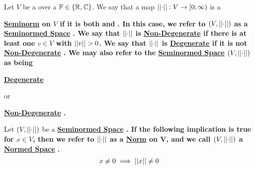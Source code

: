 \label{def:seminorm}
\newcommand{\Seminorm}[0]{
    \bf \hyperref[def:seminorm]{Seminorm} \rm
}\newcommand{\Seminorms}[0]{
    \bf \hyperref[def:seminorm]{Seminorms} \rm
}
\newcommand{\NonDegenerate}[0]{
	\bf \hyperref[def:seminorm]{Non-Degenerate} \rm
}
\newcommand{\Degenerate}[0]{
	\bf \hyperref[def:seminorm]{Degenerate} \rm
}
\label{def:seminormedspace}
\newcommand{\SeminormedSpace}[0]{
    \bf \hyperref[def:seminormedspace]{Seminormed Space} \rm
}
\newcommand{\SeminormedSpaces}[0]{
    \bf \hyperref[def:seminormedspace]{Seminormed Spaces} \rm
}
\begin{df}[Seminorm]
    Let 
	$V$ be a 
	\VectorSpace
	over a 
	\Field 
	$\mathbb{F} \in \{ \mathbb{R}, \mathbb{C}\}$.  
    We say that a map 
	$\left|\left| \cdot \right|\right|:V \to [0,\infty)$ 
	is a 
	\Seminorm on 
	$V$ 
	if it is both \Subadditive and \AbsScalarHomogeneous. 
	In this case, we refer to $(V, \left|\left| \cdot \right|\right|)$ as a \SeminormedSpace. 
	We say that $\left|\left| \cdot \right|\right|$ is \NonDegenerate if there is at least one $v \in V$ with $\norm{v}>0$. 
	We say that $\left|\left| \cdot \right|\right|$ is \Degenerate if it is not \NonDegenerate.  
	We may also refer to the \SeminormedSpace $(V, \left|\left| \cdot \right|\right|)$ as being
	\Degenerate
	or
	\NonDegenerate. 
\end{df} 





\label{def:norm}
\newcommand{\Norm}[0]{
    \bf \hyperref[def:norm]{Norm} \rm
}
\label{def:normedspace}
\newcommand{\NormedSpace}[0]{
    \bf \hyperref[def:normedspace]{Normed Space} \rm
}\newcommand{\NormedSpaces}[0]{
    \bf \hyperref[def:normedspace]{Normed Spaces} \rm
}
\begin{df}[Norm]
    Let $(V,\left|\left| \cdot \right|\right|)$ be a \SeminormedSpace.
    If the following implication is true for $x \in V$, then we refer to $\left|\left| \cdot \right|\right|$ as a \Norm on V, and we call $(V, \left|\left| \cdot \right|\right|)$ a \NormedSpace.
    \begin{equation}
    x \neq 0 \implies \left|\left| x \right|\right| \neq 0
    \end{equation}
\end{df}

